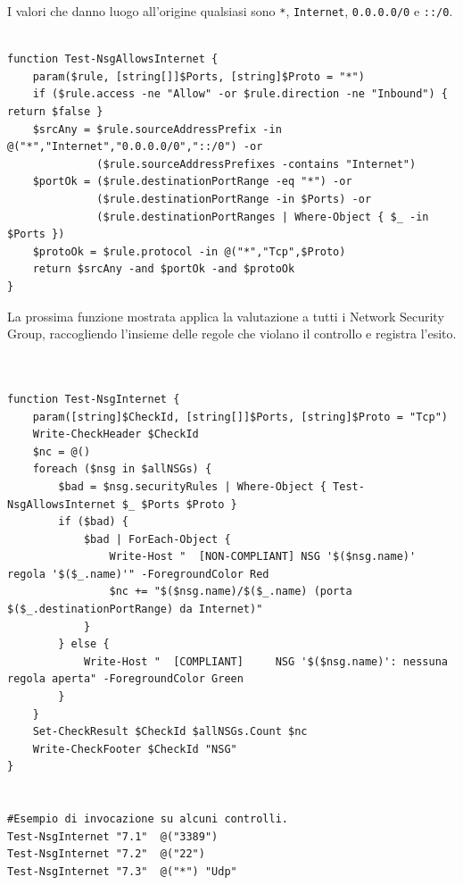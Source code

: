 \documentclass[a4paper,11pt]{report}
\begin{document}
I valori che danno luogo all'origine qualsiasi sono \texttt{*}, \texttt{Internet}, \texttt{0.0.0.0/0} e \texttt{::/0}.

\begin{lstlisting}[style=azcli, caption={Funzione \texttt{Test-NsgAllowsInternet} per la valutazione di una regola di sicurezza}, label={lst:nsg-allows}]

function Test-NsgAllowsInternet {
    param($rule, [string[]]$Ports, [string]$Proto = "*")
    if ($rule.access -ne "Allow" -or $rule.direction -ne "Inbound") { return $false }
    $srcAny = $rule.sourceAddressPrefix -in @("*","Internet","0.0.0.0/0","::/0") -or
              ($rule.sourceAddressPrefixes -contains "Internet")
    $portOk = ($rule.destinationPortRange -eq "*") -or
              ($rule.destinationPortRange -in $Ports) -or
              ($rule.destinationPortRanges | Where-Object { $_ -in $Ports })
    $protoOk = $rule.protocol -in @("*","Tcp",$Proto)
    return $srcAny -and $portOk -and $protoOk
}
\end{lstlisting}

La prossima funzione mostrata applica la valutazione a tutti i Network Security Group, raccogliendo l'insieme delle regole che violano il controllo e registra l'esito.\\\\

\begin{lstlisting}[style=azcli, caption={Funzione condivisa \texttt{Test-NsgInternet} per i controlli sull'esposizione verso Internet}, label={lst:nsg-internet}]

function Test-NsgInternet {
    param([string]$CheckId, [string[]]$Ports, [string]$Proto = "Tcp")
    Write-CheckHeader $CheckId 
    $nc = @()
    foreach ($nsg in $allNSGs) {
        $bad = $nsg.securityRules | Where-Object { Test-NsgAllowsInternet $_ $Ports $Proto }
        if ($bad) {
            $bad | ForEach-Object {
                Write-Host "  [NON-COMPLIANT] NSG '$($nsg.name)' regola '$($_.name)'" -ForegroundColor Red
                $nc += "$($nsg.name)/$($_.name) (porta $($_.destinationPortRange) da Internet)"
            }
        } else {
            Write-Host "  [COMPLIANT]     NSG '$($nsg.name)': nessuna regola aperta" -ForegroundColor Green
        }
    }
    Set-CheckResult $CheckId $allNSGs.Count $nc
    Write-CheckFooter $CheckId "NSG"
}


#Esempio di invocazione su alcuni controlli.
Test-NsgInternet "7.1"  @("3389")
Test-NsgInternet "7.2"  @("22")
Test-NsgInternet "7.3"  @("*") "Udp"
\end{lstlisting}
\end{document}
